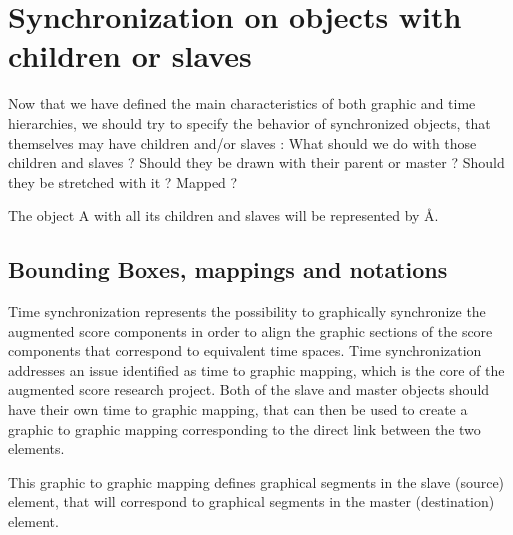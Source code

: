 \documentclass[a4paper]{article}
\begin{document}
\section{Synchronization on objects with children or slaves}\label{sec:sync_children}

Now that we have defined the main characteristics of both graphic and time hierarchies, we should try to specify the behavior of synchronized objects, that themselves may have children and/or slaves : What should we do with those children and slaves ? Should they be drawn with their parent or master ? Should they be stretched with it ? Mapped ?

The object A with all its children and slaves will be represented by \r{A}.

%
%  
%
%
%
%
%

\subsection{Bounding Boxes, mappings and notations}\label{subsec:bb}

Time synchronization represents the possibility to graphically synchronize the augmented score components in order to align the graphic sections of the score components that correspond to equivalent time spaces. Time synchronization addresses an issue identified as time to graphic mapping, which is the core of the augmented score research project. Both of the slave and master objects should have their own time to graphic mapping, that can then be used to create a graphic to graphic mapping corresponding to the direct link between the two elements. 

This graphic to graphic mapping defines graphical segments in the slave (source) element, that will correspond to graphical segments in the master (destination) element.
\end{document}
